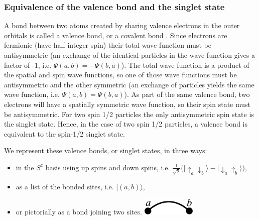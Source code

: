 \subsubsection{Equivalence of the valence bond and the singlet state}
{{A bond between two atoms created by sharing valence electrons in the outer orbitals is called a valence bond, or a covalent bond \cite{Slater1931,Pauling1933}.
Since electrons are fermionic (have half integer spin) their total
wave function must be antisymmetric (an exchange of the identical particles in the wave function
gives a factor of -1, i.e. $\Psi(a,b) = -\Psi(b,a)$).
The total wave function is a product of the spatial and spin wave functions, so one of those wave functions must be antisymmetric and the other symmetric (an exchange of particles yields the same wave function, i.e. $\Psi(a,b) = \Psi(b,a)$).
As part of the same valence bond, two electrons will have a spatially symmetric wave function, so their spin state must be antisymmetric.  For two spin 1/2 particles the only antisymmetric spin state is the singlet state.  
Hence, in the case of two spin 1/2 particles, a valence bond is equivalent to the spin-1/2 singlet state.}}

We represent these valence bonds, or singlet states, in three ways: 
\begin{itemize}
\item{in the $S^z$ basis using up spins and down spins, 
i.e. $\tfrac{1}{\sqrt{2}}\big(\lvert \uparrow_a \downarrow_b \rangle - \lvert \downarrow_a \uparrow_b \rangle\big)$,}
\item{ as a list of the bonded sites, i.e. $\lvert(a,b)\rangle$,}
\vspace{-3mm}
\item{
or pictorially as a bond joining two sites.\; \includegraphics[width=1in]{./figures/made/bond2.pdf}}
\end{itemize}

